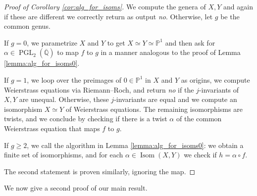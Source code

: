 \documentclass{amsproc}
\numberwithin{equation}{section}
\numberwithin{figure}{section}
\theoremstyle{definition}
\theoremstyle{remark}
\DeclareMathOperator{\PGL}{PGL}
\DeclareMathOperator{\Isom}{Isom}
\newcommand{\Qbar}{\overline{\mathbb{Q}}}
\newcommand\PP{\mathbb{P}}
\renewcommand{\geq}{\geqslant}
\newcommand{\jv}[1]{{\color{red} \textsf{[[#1]]}}}
\begin{document}
\begin{proof}[Proof of Corollary \ref{cor:alg_for_isoms}]
We compute the genera of $X,Y$ and again if these are different we correctly return as output \emph{no}.  Otherwise, let $g$ be the common genus.  %

If $g=0$, we parametrize $X$ and $Y$ to get $X \simeq Y \simeq \PP^1$ and then ask for $\alpha \in \PGL_2(\Qbar)$ to map $f$ to $g$ in a manner analogous to the proof of Lemma \ref{lemma:alg_for_isoms0}.

If $g=1$, we loop over the preimages of $0 \in \PP^1$ in $X$ and $Y$ as origins, we compute Weierstrass equations via Riemann--Roch, and return \emph{no} if the $j$-invariants of $X,Y$ are unequal.  Otherwise, these $j$-invariants are equal and we compute an isomorphism $X \simeq Y$ of Weierstrass equations.  The remaining isomorphisms are twists, and we conclude by checking if there is a twist $\alpha$ of the common Weierstrass equation that maps $f$ to $g$.  

If $g \geq 2$, we call the algorithm in Lemma \ref{lemma:alg_for_isoms0}: we obtain a finite set of isomorphisms, and for each $\alpha \in \Isom(X,Y)$ we check if $h=\alpha \circ f$.

The second statement is proven similarly, ignoring the map.  
\end{proof}




 
We now give a second proof of our main result.
 
\end{document}
